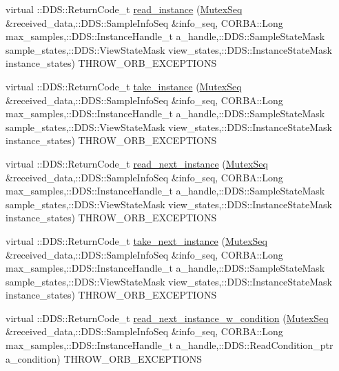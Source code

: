 \begin{DoxyCompactItemize}
\item 
virtual ::DDS::ReturnCode\_\-t \hyperlink{classKnowledge_1_1MutexDataReader__impl_a1ed93437119aa585d4dea4cbf0641c81}{read\_\-instance} (\hyperlink{namespaceKnowledge_a3165529aa87299c6a92754fbd7eeeff4}{MutexSeq} \&received\_\-data,::DDS::SampleInfoSeq \&info\_\-seq, CORBA::Long max\_\-samples,::DDS::InstanceHandle\_\-t a\_\-handle,::DDS::SampleStateMask sample\_\-states,::DDS::ViewStateMask view\_\-states,::DDS::InstanceStateMask instance\_\-states) THROW\_\-ORB\_\-EXCEPTIONS
\item 
virtual ::DDS::ReturnCode\_\-t \hyperlink{classKnowledge_1_1MutexDataReader__impl_a9e0cccab80da9bdf96ceac35218fbcf3}{take\_\-instance} (\hyperlink{namespaceKnowledge_a3165529aa87299c6a92754fbd7eeeff4}{MutexSeq} \&received\_\-data,::DDS::SampleInfoSeq \&info\_\-seq, CORBA::Long max\_\-samples,::DDS::InstanceHandle\_\-t a\_\-handle,::DDS::SampleStateMask sample\_\-states,::DDS::ViewStateMask view\_\-states,::DDS::InstanceStateMask instance\_\-states) THROW\_\-ORB\_\-EXCEPTIONS
\item 
virtual ::DDS::ReturnCode\_\-t \hyperlink{classKnowledge_1_1MutexDataReader__impl_a94009dd293f932dec79b081ef91cb024}{read\_\-next\_\-instance} (\hyperlink{namespaceKnowledge_a3165529aa87299c6a92754fbd7eeeff4}{MutexSeq} \&received\_\-data,::DDS::SampleInfoSeq \&info\_\-seq, CORBA::Long max\_\-samples,::DDS::InstanceHandle\_\-t a\_\-handle,::DDS::SampleStateMask sample\_\-states,::DDS::ViewStateMask view\_\-states,::DDS::InstanceStateMask instance\_\-states) THROW\_\-ORB\_\-EXCEPTIONS
\item 
virtual ::DDS::ReturnCode\_\-t \hyperlink{classKnowledge_1_1MutexDataReader__impl_a30cdf9a7e76a9981de1b2193892c9052}{take\_\-next\_\-instance} (\hyperlink{namespaceKnowledge_a3165529aa87299c6a92754fbd7eeeff4}{MutexSeq} \&received\_\-data,::DDS::SampleInfoSeq \&info\_\-seq, CORBA::Long max\_\-samples,::DDS::InstanceHandle\_\-t a\_\-handle,::DDS::SampleStateMask sample\_\-states,::DDS::ViewStateMask view\_\-states,::DDS::InstanceStateMask instance\_\-states) THROW\_\-ORB\_\-EXCEPTIONS
\item 
virtual ::DDS::ReturnCode\_\-t \hyperlink{classKnowledge_1_1MutexDataReader__impl_a336d77f73e8f2695de4a806878fcdce1}{read\_\-next\_\-instance\_\-w\_\-condition} (\hyperlink{namespaceKnowledge_a3165529aa87299c6a92754fbd7eeeff4}{MutexSeq} \&received\_\-data,::DDS::SampleInfoSeq \&info\_\-seq, CORBA::Long max\_\-samples,::DDS::InstanceHandle\_\-t a\_\-handle,::DDS::ReadCondition\_\-ptr a\_\-condition) THROW\_\-ORB\_\-EXCEPTIONS

\end{DoxyCompactItemize}
